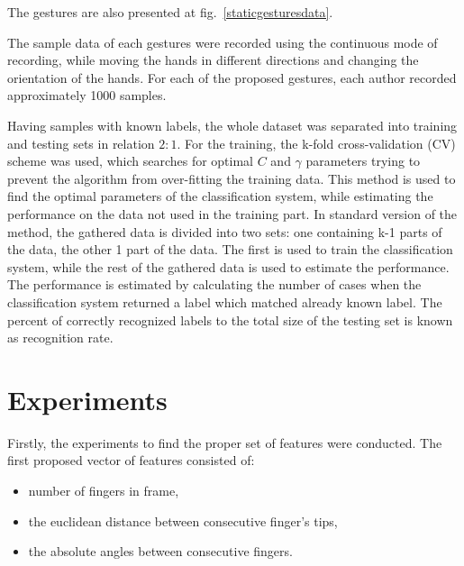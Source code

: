 The gestures are also presented at fig.~\ref{staticgesturesdata}.


The sample data of each gestures were recorded using the continuous mode of recording, while moving the hands in different directions and changing the orientation of the hands. 
For each of the proposed gestures, each author recorded approximately 1000 samples.

Having samples with known labels, the whole dataset was separated into training and testing sets in relation $2:1$. 
For the training, the k-fold cross-validation (CV) scheme was used, which searches for optimal $C$ and $\gamma$ parameters trying to prevent the algorithm from over-fitting the training data.
This method is used to find the optimal parameters of the classification system, while estimating the performance on the data not used in the training part. 
In standard version of the method, the gathered data is divided into two sets: one containing k-1 parts of the data, the other 1 part of the data. 
The first is used to train the classification system, while the rest of the gathered data is used to estimate the performance. 
The performance is estimated by calculating the number of cases when the classification system returned a label which matched already known label. 
The percent of correctly recognized labels to the total size of the testing set is known as recognition rate.


\section{Experiments}
\label{static:exp}

Firstly, the experiments to find the proper set of features were conducted. The first proposed vector of features consisted of:
\begin{itemize}
\item number of fingers in frame,
\item the euclidean distance between consecutive finger's tips,
\item the absolute angles between consecutive fingers.
\end{itemize} 

